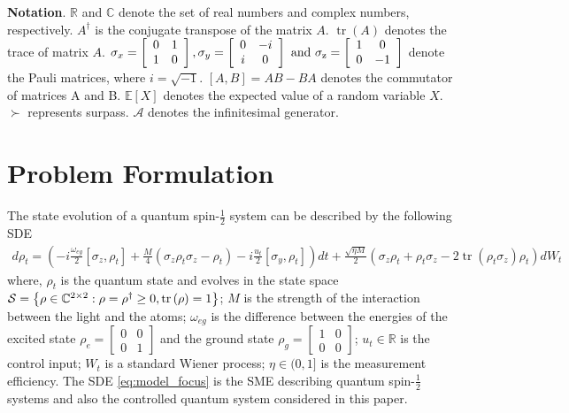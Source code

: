 \documentclass[]{elsarticle}
\begin{document}
\textbf{Notation}.  $\mathbb{R}$ and $\mathbb{C}$ denote the set of real numbers and complex numbers, respectively. $A^\dag $ is the conjugate transpose of the matrix $A$. $\operatorname{tr}(A)$ denotes the trace of matrix $A$. $\sigma_x=\left[\begin{array}{cc}
	0 & 1 \\
	1 & 0
\end{array}\right], \sigma_y=\left[\begin{array}{cc}
	0 & -i\\
	i& 0
\end{array}\right]~\rm{and}~ \sigma_z=\left[\begin{array}{cc}
	1 & 0 \\
	0 & -1
\end{array}\right]
$
denote the Pauli matrices, where $i=\sqrt{-1}$. $[A, B]=AB-BA$ denotes the commutator of matrices A and B. $\mathbb{E}\left[X\right]$ denotes the expected value of a random variable $X$. $\succ$ represents surpass. $\mathcal{A}$ denotes the infinitesimal generator.

\section{Problem Formulation}\label{Sec:SystemModel}
The state evolution of a quantum spin-$\frac{1}{2}$ system can be described by the following {} SDE \cite{LAMC2018}
\begin{equation}\label{eq:model_focus}
	\begin{aligned}
		d \rho_{t} =\left(-i\frac{\omega_{eg}}{2}\left[\sigma_z,\rho_{t}\right]+\frac{M}{4}\left(\sigma_z\rho_{t}\sigma_z-\rho_{t}\right)-i\frac{u_t}{2}\left[\sigma_y,\rho_{t}\right]\right) d t
		+\frac{\sqrt{\eta M}}{2} \left(\sigma_z\rho_t+\rho_t \sigma_z-2\operatorname{tr}\left(\rho_t\sigma_z\right) \rho_t\right)d W_{t}
	\end{aligned}
\end{equation}
where, ${\rho _t}$ is the quantum state and evolves in the state space $\mathcal{S}=\left\{
{{\rho} \in {\mathbb{C}^{2 \times 2}}:{\rho} = {\rho}^\dag \ge 0,{\rm{tr}}\left( {{\rho}} \right) =
	1}
\right\}$; $M$ is the strength of the interaction between the light and the atoms; $\omega_{eg}$ is the difference between the energies of the excited state $\rho_e=\left[\begin{array}{cc}
	0 & 0 \\
	0 & 1
\end{array}\right]$ and the ground state $\rho_g=\left[\begin{array}{cc}
	1 & 0 \\
	0 & 0
\end{array}\right]$; $u_t \in \mathbb{R}$ is the control input; $W_t$ is a standard Wiener process;  $\eta \in(0,1]$ is the measurement efficiency. The {} SDE \eqref{eq:model_focus} is the SME describing quantum spin-$\frac{1}{2}$ systems and also the controlled quantum system considered in this paper. 
\end{document}
